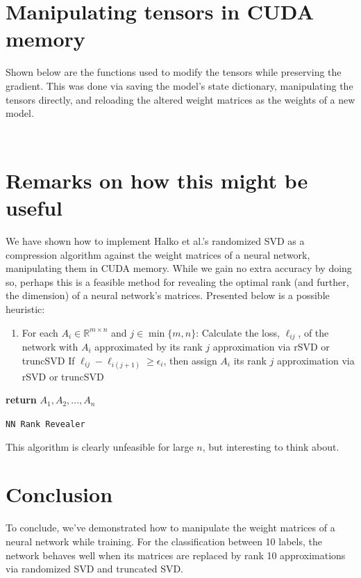 \documentclass{article}
\begin{document}
\section{Manipulating tensors in CUDA memory}
Shown below are the functions used to modify the tensors while preserving the gradient.
This was done via saving the model's state dictionary, manipulating the tensors directly, and reloading the altered weight matrices as the weights of a new model.
\inputminted{python}{snippets/rSVD.py}
\inputminted{python}{snippets/truncSVD.py}

\section{Remarks on how this might be useful}
We have shown how to implement Halko et al.'s randomized SVD as a compression algorithm against the weight matrices of a neural network, manipulating them in CUDA memory.
While we gain no extra accuracy by doing so, perhaps this is a feasible method for revealing the optimal rank (and further, the dimension) of a neural network's matrices.
Presented below is a possible heuristic:
\begin{center}
	\begin{minipage}{0.5\linewidth} %
		\begin{algorithm}[H]
			\medskip
			\begin{enumerate}
				\item For each $A_i \in \mathbb{R}^{m \times n}$ and $j \in \min\{m,n\}$:
				\subitem Calculate the loss, $\ell_{ij}$, of the network with $A_i$ approximated by its rank $j$ approximation via rSVD or truncSVD
				\subitem If $\ell_{ij} - \ell_{i(j+1)} \geq \epsilon_i$, then assign $A_i$ its rank $j$ approximation via rSVD or truncSVD
			\end{enumerate}
			
			{\bf return} $A_1, A_2, ..., A_n$
			\caption{\texttt{NN Rank Revealer}} %
		\end{algorithm}
	\end{minipage}
\end{center}

This algorithm is clearly unfeasible for large $n$, but interesting to think about.

\section{Conclusion}

To conclude, we've demonstrated how to manipulate the weight matrices of a neural network while training.
For the classification between 10 labels, the network behaves well when its matrices are replaced by rank 10 approximations via randomized SVD and truncated SVD.
\end{document}
